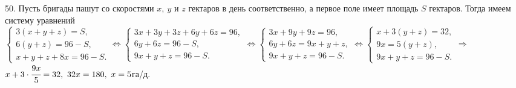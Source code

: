 50. Пусть бригады пашут со скоростями $x,\ y$ и $z$ гектаров в день соответственно, а первое поле имеет площадь $S$ гектаров. Тогда имеем систему уравнений
$\begin{cases}3(x+y+z)=S,\\ 6(y+z)=96-S,\\ x+y+z+8x=96-S.\end{cases}\Leftrightarrow
\begin{cases}3x+3y+3z+6y+6z=96,\\ 6y+6z=96-S,\\ 9x+y+z=96-S.\end{cases}\Leftrightarrow
\begin{cases}3x+9y+9z=96,\\ 6y+6z=9x+y+z,\\ 9x+y+z=96-S.\end{cases}\Leftrightarrow
\begin{cases}x+3(y+z)=32,\\ 9x=5(y+z),\\ 9x+y+z=96-S.\end{cases}\Rightarrow$\\$
x+3\cdot\cfrac{9x}{5}=32,\ 32x=180,\ x=5$га/д.\\
